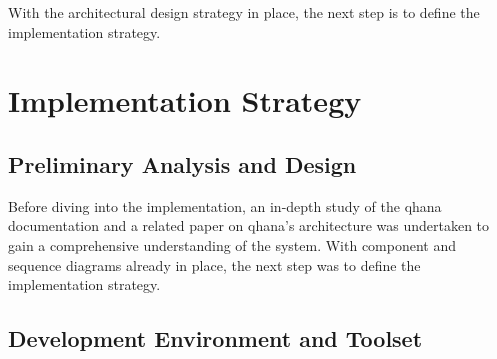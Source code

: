 \documentclass[
  a4paper,  %
  twoside,  %
  bibliography=totoc,
  headsepline,
  cleardoublepage=empty,
  parskip=half,
  draft=false
]{scrbook}
\begin{document}
With the architectural design strategy in place, the next step is to define the implementation strategy.

\section{Implementation Strategy}
\label{sec:implementationStrategy}

\subsection{Preliminary Analysis and Design}
Before diving into the implementation, an in-depth study of the \gls{qhana} documentation and a related paper on \gls{qhana}'s architecture \cite{Buehler2022} was undertaken to gain a comprehensive understanding of the system.
With component and sequence diagrams already in place, the next step was to define the implementation strategy.

\subsection{Development Environment and Toolset}
\end{document}
